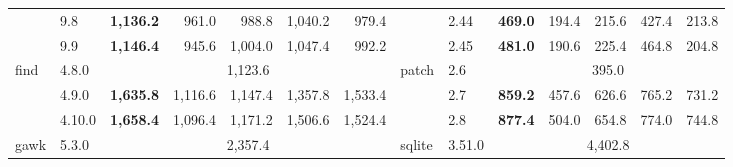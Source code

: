 \begin{table}[]
{\begin{tabular}{l|l|rrrrr||l|l|rrrrr}
                            & 9.8     & \multicolumn{1}{r|}{\textbf{1,136.2}} & \multicolumn{1}{r|}{961.0}   & \multicolumn{1}{r|}{988.8}   & \multicolumn{1}{r|}{1,040.2} & 979.4                      &                          & 2.44    & \multicolumn{1}{r|}{\textbf{469.0}}    & \multicolumn{1}{r|}{194.4}    & \multicolumn{1}{r|}{215.6}    & \multicolumn{1}{r|}{427.4}    & 213.8                     \\ \cmidrule(lr){2-7} \cmidrule{9-14} 
                            & 9.9     & \multicolumn{1}{r|}{\textbf{1,146.4}} & \multicolumn{1}{r|}{945.6}   & \multicolumn{1}{r|}{1,004.0} & \multicolumn{1}{r|}{1,047.4} & 992.2                      &                          & 2.45    & \multicolumn{1}{r|}{\textbf{481.0}}    & \multicolumn{1}{r|}{190.6}    & \multicolumn{1}{r|}{225.4}    & \multicolumn{1}{r|}{464.8}    & 204.8                     \\ \midrule
    \multirow{3}{*}{find}   & 4.8.0   & \multicolumn{5}{c||}{1,123.6}                                                                                                                           & \multirow{3}{*}{patch}   & 2.6     & \multicolumn{5}{c}{395.0}                                                                                                                                 \\ \cmidrule(lr){2-7} \cmidrule{9-14} 
                            & 4.9.0   & \multicolumn{1}{r|}{\textbf{1,635.8}} & \multicolumn{1}{r|}{1,116.6} & \multicolumn{1}{r|}{1,147.4} & \multicolumn{1}{r|}{1,357.8} & 1,533.4                    &                          & 2.7     & \multicolumn{1}{r|}{\textbf{859.2}}    & \multicolumn{1}{r|}{457.6}    & \multicolumn{1}{r|}{626.6}    & \multicolumn{1}{r|}{765.2}    & 731.2                     \\ \cmidrule(lr){2-7} \cmidrule{9-14} 
                            & 4.10.0  & \multicolumn{1}{r|}{\textbf{1,658.4}} & \multicolumn{1}{r|}{1,096.4} & \multicolumn{1}{r|}{1,171.2} & \multicolumn{1}{r|}{1,506.6} & 1,524.4                    &                          & 2.8     & \multicolumn{1}{r|}{\textbf{877.4}}    & \multicolumn{1}{r|}{504.0}    & \multicolumn{1}{r|}{654.8}    & \multicolumn{1}{r|}{774.0}    & 744.8                     \\ \midrule
    \multirow{3}{*}{gawk}   & 5.3.0   & \multicolumn{5}{c||}{2,357.4}                                                                                                                           & \multirow{3}{*}{sqlite}  & 3.51.0  & \multicolumn{5}{c}{4,402.8}                                                                                                                               \\ \cmidrule(lr){2-7} \cmidrule{9-14} 

\end{tabular}}
\end{table}
